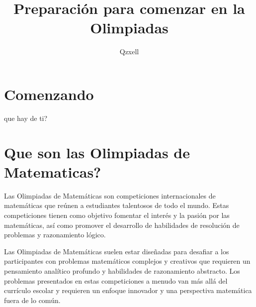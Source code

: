 \documentclass[11pt]{scrartcl}
\author{Qzxell}
\title{Preparaci\'on para comenzar en la Olimpiadas}
\begin{document}
\maketitle
\section{Comenzando}
que hay de ti?

\section{Que son las Olimpiadas de Matematicas?}

Las Olimpiadas de Matem\'aticas son competiciones internacionales de matem\'aticas que re\'unen a estudiantes talentosos de todo el mundo. Estas competiciones tienen como objetivo fomentar el inter\'es y la pasi\'on por las matem\'aticas, as\'i como promover el desarrollo de habilidades de resoluci\'on de problemas y razonamiento l\'ogico.

Las Olimpiadas de Matemáticas suelen estar diseñadas para desafiar a los participantes con problemas matemáticos complejos y creativos que requieren un pensamiento analítico profundo y habilidades de razonamiento abstracto. Los problemas presentados en estas competiciones a menudo van más allá del currículo escolar y requieren un enfoque innovador y una perspectiva matemática fuera de lo común.
\end{document}
